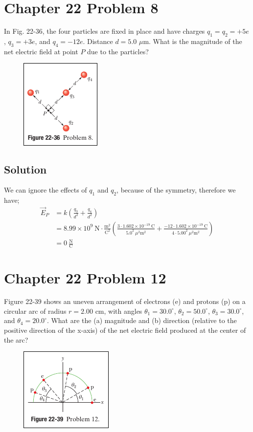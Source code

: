 \documentclass{article}
\newcommand{\m}{\text{m}}
\newcommand{\N}{\text{N}}
\newcommand{\C}{\text{C}}
\begin{document}
\section*{Chapter 22 Problem 8}
In Fig. 22-36, the four particles are fixed in place and have charges $q_1 = q_2 = +5e$, $q_3 = +3e$, and $q_4 = -12e$.
Distance $d = 5.0$ $\mu$m. What is the magnitude of the net electric field at point $P$ due to the particles?

\begin{figure}[ht]
    \centering
    \includegraphics[scale=0.75]{image-3.png}
\end{figure}

\subsection*{Solution}
We can ignore the effects of $q_1$ and $q_2$, because of the symmetry, therefore we have;
\begin{align*}
	\vec{E}_P &= k\left(\frac{q_3}{d^2} + \frac{q_4}{d^2}\right) \\
			  &= 8.99 \times 10^9\ \N \cdot \frac{\m^2}{\C^2} \left( \frac{3 \cdot 1.602 \times 10^{-19}\ \C}{5.0^2\ \mu^2 \m^2} + \frac{-12 \cdot 1.602 \times 10^{-19}\ \C}{4 \cdot 5.00^2\ \mu^2\m^2}\right) \\
			  &= \boxed{0\ \frac{\N}{\C}}
\end{align*}

\section*{Chapter 22 Problem 12}
Figure 22-39 shows an uneven arrangement of electrons (e) and protons (p) on a circular arc of radius $r = 2.00$ cm, with angles $\theta_1 = 30.0^\circ$, $\theta_2 = 50.0^\circ$, $\theta_3 = 30.0^\circ$, and $\theta_4 = 20.0^\circ$. 
What are the (a) magnitude and (b) direction (relative to the positive direction of the x-axis) of the net electric field produced at the center of the arc?

\begin{figure}[ht]
    \centering
    \includegraphics[scale=0.75]{image-4.png}
\end{figure}
\end{document}
